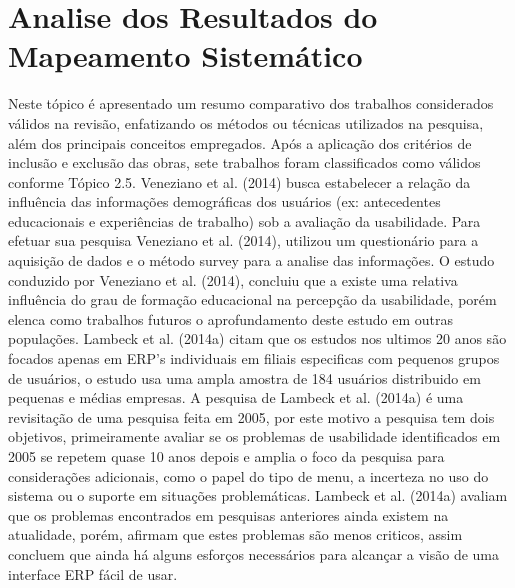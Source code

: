 \section{Analise dos Resultados do Mapeamento Sistemático}

Neste tópico é apresentado um resumo comparativo dos trabalhos considerados válidos na revisão, enfatizando os métodos ou técnicas utilizados na pesquisa, além dos principais conceitos empregados.
Após a aplicação dos critérios de inclusão e exclusão das obras, sete trabalhos foram classificados como válidos conforme Tópico 2.5.\newline
\newline
\indent Veneziano et al. (2014) busca estabelecer a relação da influência das informações demográficas dos usuários (ex: antecedentes educacionais e experiências de trabalho) sob a avaliação da usabilidade.\newline
\newline
\indent Para efetuar sua pesquisa Veneziano et al. (2014), utilizou um questionário para a  aquisição de dados e o método survey para a analise das informações.\newline
\newline
\indent O estudo conduzido por  Veneziano et al. (2014),  concluiu que a existe uma relativa influência do grau de formação educacional na percepção da usabilidade, porém elenca como trabalhos futuros o aprofundamento deste estudo em outras populações.\newline
\newline
\indent Lambeck et al. (2014a) citam que os  estudos nos ultimos 20 anos são focados apenas  em ERP's individuais em filiais especificas com pequenos grupos de usuários, o estudo usa uma ampla  amostra de 184 usuários distribuido em pequenas e médias empresas.\newline
\newline
\indent A pesquisa de Lambeck et al. (2014a) é uma revisitação de uma pesquisa feita em 2005, por este motivo a pesquisa tem  dois objetivos, primeiramente  avaliar se os problemas de  usabilidade identificados em 2005 se repetem quase 10 anos depois e amplia o foco da pesquisa para considerações adicionais, como o papel do tipo de menu, a incerteza no uso do sistema ou o suporte em situações problemáticas.\newline
\newline
\indent Lambeck et al. (2014a) avaliam que os problemas encontrados em pesquisas anteriores ainda existem na  atualidade, porém, afirmam que estes problemas  são menos criticos, assim concluem que ainda há alguns esforços necessários para alcançar a visão de uma interface ERP fácil de usar.\newline
